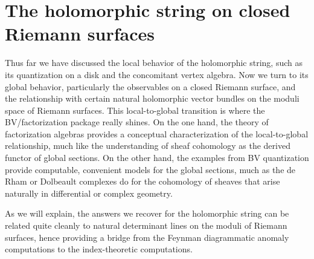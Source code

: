 \section{The holomorphic string on closed Riemann surfaces} 
\label{sec: conformalblock}


Thus far we have discussed the local behavior of the holomorphic string,
such as its quantization on a disk and the concomitant vertex algebra.
Now we turn to its global behavior, 
particularly the observables on a closed Riemann surface,
and the relationship with certain natural holomorphic vector bundles on the moduli space of Riemann surfaces.
This local-to-global transition is where the BV/factorization package really shines.
On the one hand, the theory of factorization algebras provides a conceptual characterization of the local-to-global relationship,
much like the understanding of sheaf cohomology as the derived functor of global sections.
On the other hand, the examples from BV quantization provide computable, convenient models for the global sections,
much as the de Rham or Dolbeault complexes do for the cohomology of sheaves that arise naturally in differential or complex geometry.

As we will explain, the answers we recover for the holomorphic string can be related quite cleanly to natural determinant lines on the moduli of Riemann surfaces,
hence providing a bridge from the Feynman diagrammatic anomaly computations to the index-theoretic computations.

